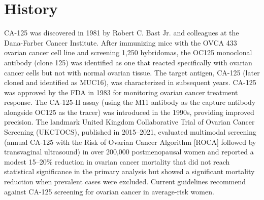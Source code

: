 \section*{History}
CA-125 was discovered in 1981 by Robert C. Bast Jr. and colleagues at the Dana-Farber Cancer Institute. After immunizing mice with the OVCA 433 ovarian cancer cell line and screening 1,250 hybridomas, the OC125 monoclonal antibody (clone 125) was identified as one that reacted specifically with ovarian cancer cells but not with normal ovarian tissue. The target antigen, CA-125 (later cloned and identified as MUC16), was characterized in subsequent years. CA-125 was approved by the FDA in 1983 for monitoring ovarian cancer treatment response. The CA-125-II assay (using the M11 antibody as the capture antibody alongside OC125 as the tracer) was introduced in the 1990s, providing improved precision. The landmark United Kingdom Collaborative Trial of Ovarian Cancer Screening (UKCTOCS), published in 2015--2021, evaluated multimodal screening (annual CA-125 with the Risk of Ovarian Cancer Algorithm [ROCA] followed by transvaginal ultrasound) in over 200,000 postmenopausal women and reported a modest 15--20\% reduction in ovarian cancer mortality that did not reach statistical significance in the primary analysis but showed a significant mortality reduction when prevalent cases were excluded. Current guidelines recommend against CA-125 screening for ovarian cancer in average-risk women.

